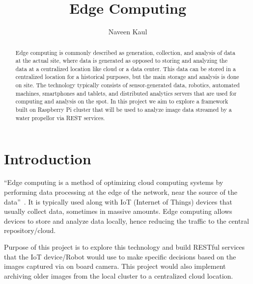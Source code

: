 
\title{Edge Computing}


\author{Naveen Kaul}

\renewcommand{\shortauthors}{N. Kaul}


\begin{abstract}
Edge computing is commonly described as generation, collection, and
analysis of data at the actual site, where data is generated as
opposed to storing and analyzing the data at a centralized location
like cloud or a data center. This data can be stored in a centralized
location for a historical purposes, but the main storage and analysis
is done on site. The technology typically consists of sensor-generated
data, robotics, automated machines, smartphones and tablets, and
distributed analytics servers that are used for computing and analysis
on the spot. In this project we aim to explore a framework built on
Raspberry Pi cluster that will be used to analyze image data streamed
by a water propellor via REST services. 
\end{abstract}



\maketitle

\section{Introduction}
``Edge computing is a method of optimizing cloud computing systems by performing data processing at the edge of the network, near the source of the data''~\cite{hid-sp18-510-edge-wiki}. It is typically used along with IoT (Internet of Things) devices that usually collect data, sometimes in massive amounts. Edge computing allows devices to store and analyze data locally, hence reducing the traffic to the central repository/cloud.

Purpose of this project is to explore this technology and build RESTful services that the IoT device/Robot would use to make specific decisions based on the images captured via on board camera. This project would also implement archiving older images from the local cluster to a centralized cloud location.


